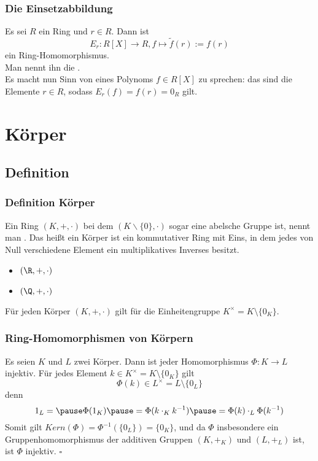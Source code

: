 %
\begin{frame}\frametitle{Die Einsetzabbildung}
Es sei $R$ ein Ring und $r \in R$. Dann ist
$$
E_r:R[X] \to R, f \mapsto \tilde f(r):=f(r)
$$
ein Ring-Homomorphismus. \\Man nennt ihn die .\pause\\
\vfill
Es macht nun Sinn von  eines Polynoms $f \in R[X]$ zu sprechen: das sind die Elemente $r \in R$, sodass $E_r(f)=f(r)=0_R$ gilt.
\end{frame}
%
%
\section{Körper}
\subsection{Definition}
%
\begin{frame}\frametitle{Definition K\"orper}
	
	Ein Ring $(K,+,\cdot)$ bei dem $(K\backslash\{0\},\cdot)$ sogar eine abelsche Gruppe ist, nennt man .
	\pause
	\vfill
	Das heißt ein Körper ist ein kommutativer Ring mit Eins, in dem jedes von Null verschiedene Element ein multiplikatives Inverses besitzt.\\
	\vfill
	\pause
	\begin{itemize}
		\item $(\R,+,\cdot)$
		\item $(\Q,+,\cdot)$
	\end{itemize}
	\pause
	\vfill
Für jeden Körper $(K,+,\cdot)$ gilt für die Einheitengruppe $K^\times =K\setminus \{0_K\}$.
\end{frame}
%
\begin{frame}\frametitle{Ring-Homomorphismen von Körpern}
Es seien $K$ und $L$ zwei Körper. Dann ist jeder Homomorphismus $\Phi:K \to L$ injektiv. \pause
\vfill
{} Für jedes Element $k \in K^\times=K\setminus\{0_K\}$ gilt \pause
$$
\Phi(k) \in L^\times=L\setminus\{0_L\}
$$ \pause
denn 
$$1_L=\pause \Phi(1_K) \pause =\Phi(k\cdot_K k^{-1}) \pause=\Phi(k)\cdot_L \Phi(k^{-1})$$\pause
Somit gilt $Kern(\Phi)=\Phi^{-1}(\{0_L\})=\{0_K\}$, \pause und da $\Phi$ insbesondere ein Gruppenhomomorphismus der additiven Gruppen $(K,+_K)$ und $(L,+_L)$ ist, ist $\Phi$ injektiv. \hfill $\square$
\end{frame}
%
